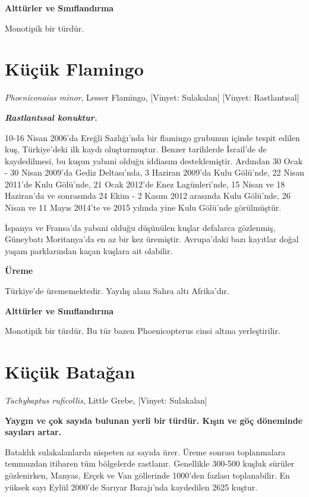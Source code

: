 \documentclass[
  a4paper,
  DIV=11,
  numbers=noendperiod]{scrreprt}
\begin{document}
\textbf{Alttürler ve Sınıflandırma}

Monotipik bir türdür.

\section{Küçük Flamingo}\label{kuxfcuxe7uxfck-flamingo}

\emph{Phoeniconaias minor}, Lesser Flamingo, {[}Vinyet: Sulakalan{]}
{[}Vinyet: Rastlantısal{]}

\textbf{\emph{Rastlantısal konuktur.}}

10-16 Nisan 2006'da Ereğli Sazlığı'nda bir flamingo grubunun içinde
tespit edilen kuş, Türkiye'deki ilk kaydı oluşturmuştur. Benzer
tarihlerde İsrail'de de kaydedilmesi, bu kuşun yabani olduğu iddiasını
desteklemiştir. Ardından 30 Ocak - 30 Nisan 2009'da Gediz Deltası'nda, 3
Haziran 2009'da Kulu Gölü'nde, 22 Nisan 2011'de Kulu Gölü'nde, 21 Ocak
2012'de Enez Lagünleri'nde, 15 Nisan ve 18 Haziran'da ve sonrasında 24
Ekim - 2 Kasım 2012 arasında Kulu Gölü'nde, 26 Nisan ve 11 Mayıs 2014'te
ve 2015 yılında yine Kulu Gölü'nde görülmüştür.

İspanya ve Fransa'da yabani olduğu düşünülen kuşlar defalarca gözlenmiş,
Güneybatı Moritanya'da en az bir kez üremiştir. Avrupa'daki bazı
kayıtlar doğal yaşam parklarından kaçan kuşlara ait olabilir.

\textbf{Üreme}

Türkiye'de ürememektedir. Yayılış alanı Sahra altı Afrika'dır.

\textbf{Alttürler ve Sınıflandırma}

Monotipik bir türdür. Bu tür bazen Phoenicopterus cinsi altına
yerleştirilir.

\section{Küçük Batağan}\label{kuxfcuxe7uxfck-bataux11fan}

\emph{Tachybaptus ruficollis}, Little Grebe, {[}Vinyet: Sulakalan{]}

\textbf{Yaygın ve çok sayıda bulunan yerli bir türdür. Kışın ve göç
döneminde sayıları artar.}

Bataklık sulakalanlarda nispeten az sayıda ürer. Üreme sonrası
toplanmalara temmuzdan itibaren tüm bölgelerde rastlanır. Genellikle
300-500 kuşluk sürüler gözlenirken, Manyas, Erçek ve Van göllerinde
1000'den fazlası toplanabilir. En yüksek sayı Eylül 2000'de Sarıyar
Barajı'nda kaydedilen 2625 kuştur.
\end{document}
